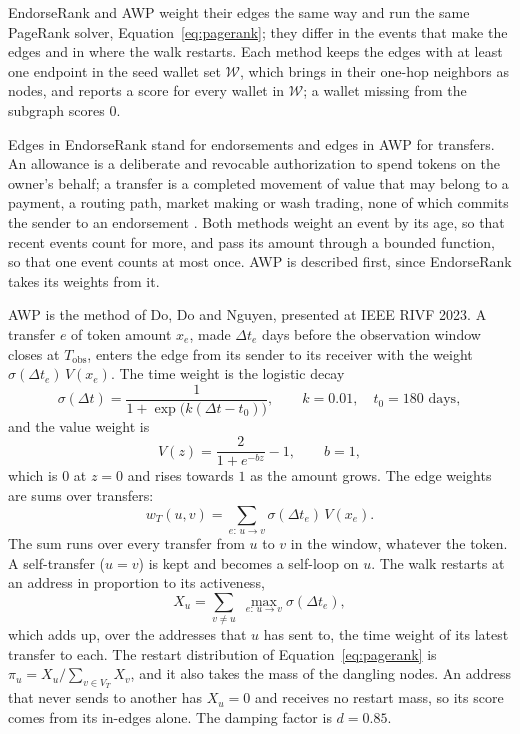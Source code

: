 
EndorseRank and AWP weight their edges the same way and run the same PageRank solver, Equation~\eqref{eq:pagerank}; they differ in the events that make the edges and in where the walk restarts. Each method keeps the edges with at least one endpoint in the seed wallet set $\mathcal{W}$, which brings in their one-hop neighbors as nodes, and reports a score for every wallet in $\mathcal{W}$; a wallet missing from the subgraph scores $0$.

Edges in EndorseRank stand for endorsements and edges in AWP for transfers. An allowance is a deliberate and revocable authorization to spend tokens on the owner's behalf; a transfer is a completed movement of value that may belong to a payment, a routing path, market making or wash trading, none of which commits the sender to an endorsement . Both methods weight an event by its age, so that recent events count for more, and pass its amount through a bounded function, so that one event counts at most once. AWP is described first, since EndorseRank takes its weights from it.


AWP is the method of Do, Do and Nguyen, presented at IEEE RIVF 2023. A transfer $e$ of token amount $x_e$, made $\Delta t_e$ days before the observation window closes at $T_{\mathrm{obs}}$, enters the edge from its sender to its receiver with the weight $\sigma(\Delta t_e)\,V(x_e)$. The time weight is the logistic decay
\begin{equation}
\label{eq:logistic-decay}
\sigma(\Delta t)
=
\frac{1}{1+\exp\bigl(k(\Delta t-t_0)\bigr)},
\qquad
k=0.01,\quad t_0=180\text{ days},
\end{equation}
and the value weight is
\begin{equation}
\label{eq:value-transform}
V(z)
=
\frac{2}{1+e^{-bz}}-1,
\qquad
b=1,
\end{equation}
which is $0$ at $z=0$ and rises towards $1$ as the amount grows. The edge weights are sums over transfers:
\begin{equation}
\label{eq:transfer-weight}
w_T(u,v)
=
\sum_{e:\,u\to v}
\sigma(\Delta t_e)\,V(x_e).
\end{equation}
The sum runs over every transfer from $u$ to $v$ in the window, whatever the token. A self-transfer ($u=v$) is kept and becomes a self-loop on $u$. The walk restarts at an address in proportion to its activeness,
\begin{equation}
\label{eq:activeness}
X_u
=
\sum_{v\neq u}\;
\max_{e:\,u\to v}\sigma(\Delta t_e),
\end{equation}
which adds up, over the addresses that $u$ has sent to, the time weight of its latest transfer to each. The restart distribution of Equation~\eqref{eq:pagerank} is $\pi_u=X_u/\sum_{v\in V_T}X_v$, and it also takes the mass of the dangling nodes. An address that never sends to another has $X_u=0$ and receives no restart mass, so its score comes from its in-edges alone. The damping factor is $d=0.85$.

